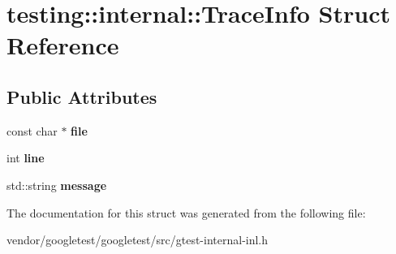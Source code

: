 \hypertarget{structtesting_1_1internal_1_1TraceInfo}{}\section{testing\+:\+:internal\+:\+:Trace\+Info Struct Reference}
\label{structtesting_1_1internal_1_1TraceInfo}
\subsection*{Public Attributes}
\begin{DoxyCompactItemize}
\item 
const char $\ast$ {\bfseries file}\hypertarget{structtesting_1_1internal_1_1TraceInfo_a5d801209d3c0840aa55cfd4b67504254}{}\label{structtesting_1_1internal_1_1TraceInfo_a5d801209d3c0840aa55cfd4b67504254}

\item 
int {\bfseries line}\hypertarget{structtesting_1_1internal_1_1TraceInfo_ae9d269de1b77f4a3180d0d34acb4d7ff}{}\label{structtesting_1_1internal_1_1TraceInfo_ae9d269de1b77f4a3180d0d34acb4d7ff}

\item 
std\+::string {\bfseries message}\hypertarget{structtesting_1_1internal_1_1TraceInfo_a39e74f39ce6d5fdbac799abdb1c27f90}{}\label{structtesting_1_1internal_1_1TraceInfo_a39e74f39ce6d5fdbac799abdb1c27f90}

\end{DoxyCompactItemize}


The documentation for this struct was generated from the following file\+:\begin{DoxyCompactItemize}
\item 
vendor/googletest/googletest/src/gtest-\/internal-\/inl.\+h\end{DoxyCompactItemize}
